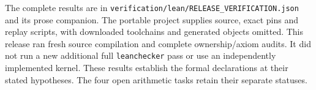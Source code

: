 The complete results are in
\nolinkurl{verification/lean/RELEASE_VERIFICATION.json} and its prose companion.
The portable project supplies source, exact pins and replay scripts, with
downloaded toolchains and generated objects omitted. This release ran fresh
source compilation and complete ownership/axiom audits. It did not run a new
additional full \texttt{leanchecker} pass or use an independently implemented
kernel. These results establish the formal declarations at their stated
hypotheses. The four open arithmetic tasks retain their separate statuses.
